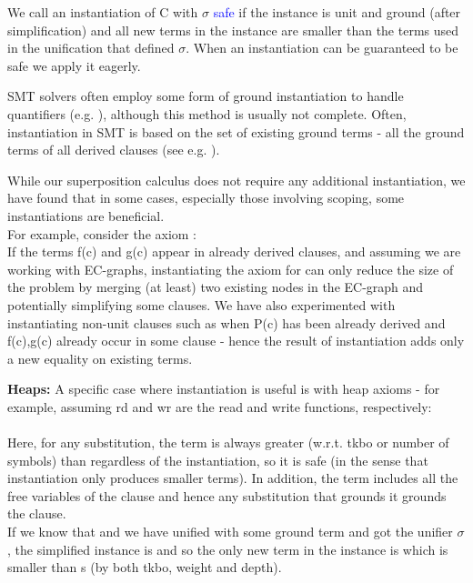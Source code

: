 We call an instantiation of C with $\sigma$ \textcolor{blue}{safe} if the instance is unit and ground (after simplification) and all new terms in the instance are smaller than the terms used in the unification that defined $\sigma$. When an instantiation can be guaranteed to be safe we apply it eagerly.

SMT solvers often employ some form of ground instantiation to handle quantifiers (e.g. \cite{Reynolds:2014:FCI:2682923.2682957}), although this method is usually not complete. Often, instantiation in SMT is based on the set of existing ground terms - all the ground terms of all derived clauses (see e.g. \cite{DBLP:conf/cade/DrossCKP12}).

While our superposition calculus does not require any additional instantiation, we have found that in some cases, especially those involving scoping, some  instantiations are beneficial.\\
For example, consider the axiom :\\
If the terms f(c) and g(c) appear in already derived clauses, and assuming we are working with EC-graphs, instantiating the axiom for  can only reduce the size of the problem by merging (at least) two existing nodes in the EC-graph and potentially simplifying some clauses.
We have also experimented with instantiating non-unit clauses such as  when P(c) has been already derived and f(c),g(c) already occur in some clause - hence the result of instantiation adds only a new equality on existing terms.


\textbf{Heaps:}
A specific case where instantiation is useful is with heap axioms - for example, assuming rd and wr are the read and write functions, respectively:\\
\\
Here, for any substitution, the term  is always greater (w.r.t. tkbo or number of symbols) than  regardless of the instantiation, so it is safe (in the sense that instantiation only produces smaller terms). In addition, the term includes all the free variables of the clause and hence any substitution that grounds it grounds the clause. \\
If we know that  and we have unified  with some ground term  and got the unifier $\sigma$, the simplified instance is  and so the only new term in the instance is  which is smaller than s (by both tkbo, weight and depth).


